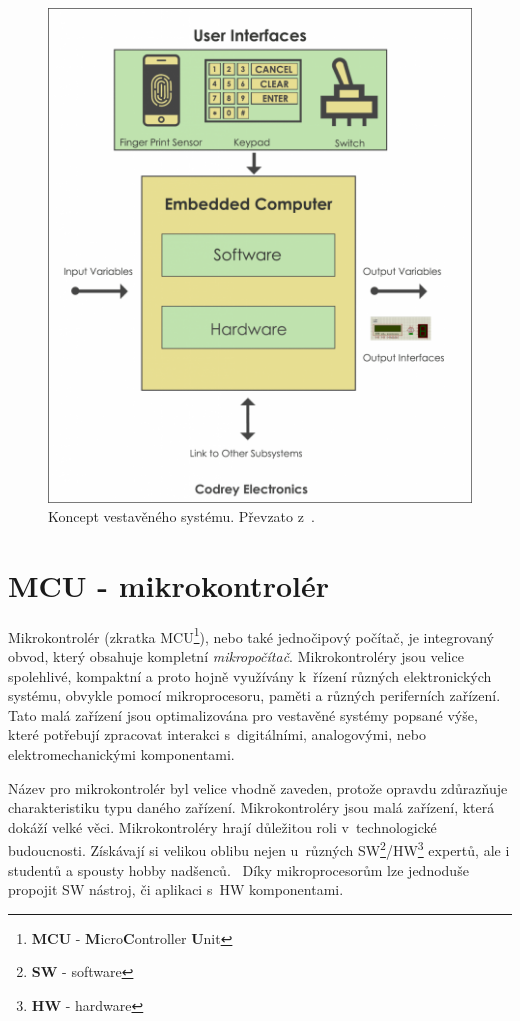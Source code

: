 \begin{figure}[hbt]
  \centering
  \includegraphics[width=.6 \linewidth]{obrazky-figures/embedded_system.png}
  \caption{
    Koncept vestavěného systému. Převzato z~\cite{embedded:figure}.
  }
  \label{figure:embedded}
\end{figure}

\newpage
\section{MCU - mikrokontrolér}
\label{terminy:mcu}

Mikrokontrolér (zkratka MCU\footnote{\textbf{MCU} - \textbf{M}icro\textbf{C}ontroller \textbf{U}nit}), nebo také jednočipový počítač, je integrovaný obvod, který obsahuje kompletní \emph{mikropočítač}.
Mikrokontroléry jsou velice spolehlivé, kompaktní a proto hojně využívány k~řízení různých elektronických systému, obvykle pomocí mikroprocesoru, paměti a různých periferních zařízení.
Tato malá zařízení jsou optimalizována pro vestavěné systémy popsané výše, které potřebují zpracovat interakci s~digitálními, analogovými, nebo elektromechanickými komponentami.

Název pro mikrokontrolér byl velice vhodně zaveden, protože opravdu zdůrazňuje charakteristiku typu daného zařízení. Mikrokontroléry jsou malá zařízení, která dokáží velké věci.
Mikrokontroléry hrají důležitou roli v~technologické budoucnosti.
Získávají si velikou oblibu nejen u~různých SW\footnote{\textbf{SW} - software}/HW\footnote{\textbf{HW} - hardware} expertů, ale i studentů a spousty hobby nadšenců.~\cite{mcu:info}
Díky mikroprocesorům lze jednoduše propojit SW nástroj, či aplikaci s~HW komponentami.

